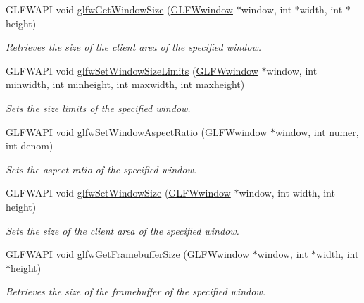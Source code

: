 \begin{CompactItemize}
GLFWAPI void \hyperlink{group__window_g7feb769ebb3f3d21579b5a3fb07be76e}{glfwGetWindowSize} (\hyperlink{group__window_g3c96d80d363e67d13a41b5d1821f3242}{GLFWwindow} $\ast$window, int $\ast$width, int $\ast$height)
\begin{CompactList}\small\item\em Retrieves the size of the client area of the specified window. \item\end{CompactList}\item 
GLFWAPI void \hyperlink{group__window_g8af814fc98d786d1de2505b40b707de8}{glfwSetWindowSizeLimits} (\hyperlink{group__window_g3c96d80d363e67d13a41b5d1821f3242}{GLFWwindow} $\ast$window, int minwidth, int minheight, int maxwidth, int maxheight)
\begin{CompactList}\small\item\em Sets the size limits of the specified window. \item\end{CompactList}\item 
GLFWAPI void \hyperlink{group__window_gd2ae94a2c5ee1c46a36e13a8f4ac68ac}{glfwSetWindowAspectRatio} (\hyperlink{group__window_g3c96d80d363e67d13a41b5d1821f3242}{GLFWwindow} $\ast$window, int numer, int denom)
\begin{CompactList}\small\item\em Sets the aspect ratio of the specified window. \item\end{CompactList}\item 
GLFWAPI void \hyperlink{group__window_ge54d1f4915ded15e267ddd3f41496cd2}{glfwSetWindowSize} (\hyperlink{group__window_g3c96d80d363e67d13a41b5d1821f3242}{GLFWwindow} $\ast$window, int width, int height)
\begin{CompactList}\small\item\em Sets the size of the client area of the specified window. \item\end{CompactList}\item 
GLFWAPI void \hyperlink{group__window_gf7d17f3534b4b6dc9a6f905e3a240b7e}{glfwGetFramebufferSize} (\hyperlink{group__window_g3c96d80d363e67d13a41b5d1821f3242}{GLFWwindow} $\ast$window, int $\ast$width, int $\ast$height)
\begin{CompactList}\small\item\em Retrieves the size of the framebuffer of the specified window. \item\end{CompactList}\item 

\end{CompactItemize}
